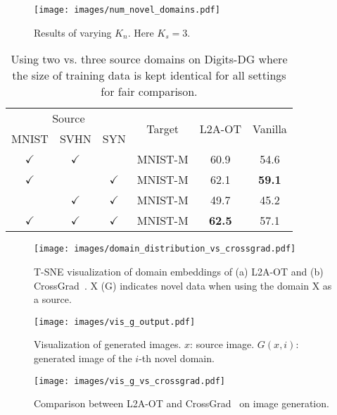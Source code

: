 \documentclass[runningheads]{llncs}
\begin{document}
\begin{figure}[t]
    \centering
    \texttt{[image: images/num\_novel\_domains.pdf]}
    \caption{Results of varying $K_n$. Here $K_s=3$.}
    \label{fig:num_novel_domains}
\end{figure}

\begin{table}[t]
\tabstyle{8pt}
\begin{tabular}{c c c | c | c c}
\hline
\multicolumn{3}{c|}{Source} & \multirow{2}{*}{Target} & \multirow{2}{*}{L2A-OT} & \multirow{2}{*}{Vanilla} \\
MNIST & SVHN & SYN & & & \\
\hline
$\checkmark$ & $\checkmark$ & & MNIST-M & 60.9 & 54.6 \\
$\checkmark$ & & $\checkmark$ & MNIST-M & 62.1 & \textbf{59.1} \\
 & $\checkmark$ & $\checkmark$ & MNIST-M & 49.7 & 45.2 \\
\hline
$\checkmark$ & $\checkmark$ & $\checkmark$ & MNIST-M & \textbf{62.5} & 57.1 \\
\hline
\end{tabular}
\caption{Using two vs. three source domains on Digits-DG where the size of training data is kept identical for all settings for fair comparison.}
\label{tab:two_vs_three_src_dom}
\end{table}

\begin{figure}[t]
    \centering
    \texttt{[image: images/domain\_distribution\_vs\_crossgrad.pdf]}
    \caption{T-SNE visualization of domain embeddings of (a) L2A-OT and (b) CrossGrad~\cite{shankar2018generalizing}. X (G) indicates novel data when using the domain X as a source.}
    \label{fig:domain_distribution_vs_crossgrad}
\end{figure}

\begin{figure}[t]
    \centering
    \texttt{[image: images/vis\_g\_output.pdf]}
    \caption{Visualization of generated images. $x$: source image. $G(x, i)$: generated image of the $i$-th novel domain.}
    \label{fig:vis_g_output}
\end{figure}

\begin{figure}[t]
    \centering
    \texttt{[image: images/vis\_g\_vs\_crossgrad.pdf]}
    \caption{Comparison between L2A-OT and CrossGrad~\cite{shankar2018generalizing} on image generation.}
    \label{fig:vis_g_vs_crossgrad}
\end{figure}
\end{document}
